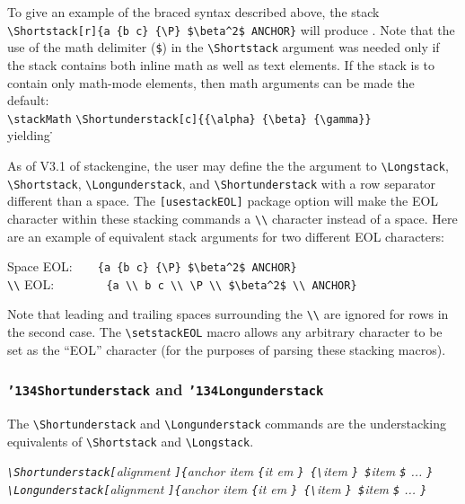 \documentclass{article}
\def\ste{\textsf{stackengine}}
\let\vb\verb
\newcommand\cmd[1]{\texttt{\char'134#1}}
\begin{document}
To give an example of the braced syntax described above,
the stack\\
\vb|\Shortstack[r]{a {b c} {\P} $\beta^2$ ANCHOR}|
will produce
.  Note that the use of the
math delimiter (\vb|$|) in the \vb|\Shortstack| argument was needed
only if the stack contains both inline math as well as text elements.
If the stack is to contain only math-mode elements, then math arguments
can be made the default:\\
\vb|\stackMath|%
\vb|\Shortunderstack[c]{{\alpha} {\beta} {\gamma}}|\\
yielding
\stackMath
\Shortunderstack[c]{{\alpha} {\beta} {\gamma}}\.
\stackText

As of V3.1 of \ste, the user may define the the argument to 
\vb|\Longstack|, \vb|\Shortstack|, \vb|\Longunderstack|, and
\vb|\Shortunderstack| with a row separator different than a space.
The \vb|[usestackEOL]| package option will make the EOL character within
these stacking commands a \vb|\\| character instead of a space.  Here
are an example of equivalent stack arguments for two different EOL
characters:

Space EOL:~~~~\vb|{a {b c} {\P} $\beta^2$ ANCHOR}|\\
\vb|\\| EOL:~~~~~~~~\,\vb|{a \\ b c \\ \P \\ $\beta^2$ \\ ANCHOR}|

Note that leading and trailing spaces surrounding the \verb|\\| are ignored 
for rows in the second
case.  The \vb|\setstackEOL| macro allows any arbitrary character to be
set as the ``EOL'' character (for the purposes of parsing these
stacking macros).

\subsubsection{\cmd{Shortunderstack} and \cmd{Longunderstack}\label{s:slus}}

The \vb|\Shortunderstack| and \vb|\Longunderstack| commands are the
understacking equivalents of \vb|\Shortstack| and \vb|\Longstack|.

\itshape
\vb|\Shortunderstack[|alignment%
  \vb|]{|anchor item %
  \vb|{|it em%
  \vb|} {\|item%
  \vb|} $|item%
  \vb|$| ...%
  \vb|}|\\
\vb|\Longunderstack[|alignment%
  \vb|]{|anchor item %
  \vb|{|it em%
  \vb|} {\|item%
  \vb|} $|item%
  \vb|$| ...%
  \vb|}|
\upshape
\end{document}
